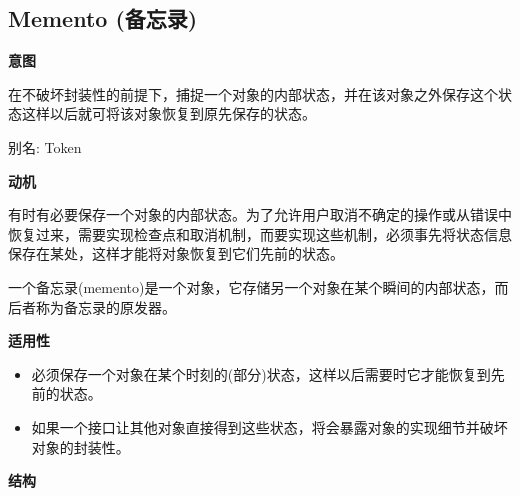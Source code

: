 \subsection{Memento (备忘录)}

\noindent\textbf{意图}

在不破坏封装性的前提下，捕捉一个对象的内部状态，并在该对象之外保存这个状态这样以后就可将该对象恢复到原先保存的状态。

别名: Token

\noindent\textbf{动机}

有时有必要保存一个对象的内部状态。为了允许用户取消不确定的操作或从错误中恢复过来，需要实现检查点和取消机制，而要实现这些机制，必须事先将状态信息保存在某处，这样才能将对象恢复到它们先前的状态。

一个备忘录(memento)是一个对象，它存储另一个对象在某个瞬间的内部状态，而后者称为备忘录的原发器。

\noindent\textbf{适用性}

\begin{itemize}
    \item 必须保存一个对象在某个时刻的(部分)状态，这样以后需要时它才能恢复到先前的状态。
    \item 如果一个接口让其他对象直接得到这些状态，将会暴露对象的实现细节并破坏对象的封装性。
\end{itemize}

\noindent\textbf{结构}

\begin{figure}[H]
    \scriptsize
    \centering
\end{figure}

